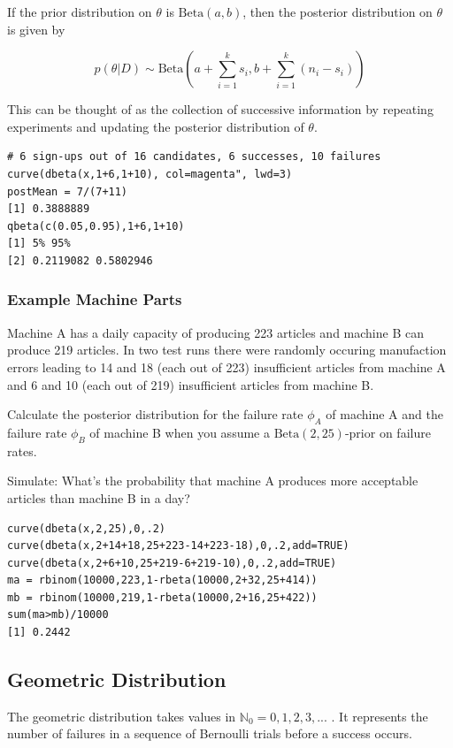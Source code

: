 \documentclass[11pt]{article}
\begin{document}
If the prior distribution on $\theta$ is $\text{Beta}(a,b)$, then the posterior distribution on $\theta$ is given by

\begin{equation*}
	p(\theta|D) \sim \text{Beta}\left(a+\sum_{i=1}^{k}s_i, b + \sum_{i=1}^{k} (n_i - s_i)\right)
\end{equation*}

This can be thought of as the collection of successive information by repeating experiments and updating the posterior distribution of $\theta$.

\begin{verbatim}
# 6 sign-ups out of 16 candidates, 6 successes, 10 failures
curve(dbeta(x,1+6,1+10), col=magenta", lwd=3)
postMean = 7/(7+11)
[1] 0.3888889
qbeta(c(0.05,0.95),1+6,1+10)
[1] 5% 95%
[2] 0.2119082 0.5802946
\end{verbatim}

\subsubsection{Example Machine Parts}
Machine A has a daily capacity of producing 223 articles and machine B can produce 219 articles. In two test runs there were randomly occuring manufaction errors leading to 14 and 18 (each out of 223) insufficient articles from machine A and 6 and 10 (each out of 219) insufficient articles from machine B.

Calculate the posterior distribution for the failure rate $\phi_A$ of machine A and the failure rate $\phi_B$ of machine B when you assume a $\text{Beta}(2,25)$-prior on failure rates.

Simulate: What’s the probability that machine A produces more acceptable articles than machine B in a day?

\begin{verbatim}
curve(dbeta(x,2,25),0,.2)
curve(dbeta(x,2+14+18,25+223-14+223-18),0,.2,add=TRUE)
curve(dbeta(x,2+6+10,25+219-6+219-10),0,.2,add=TRUE)
ma = rbinom(10000,223,1-rbeta(10000,2+32,25+414))
mb = rbinom(10000,219,1-rbeta(10000,2+16,25+422))
sum(ma>mb)/10000
[1] 0.2442
\end{verbatim}

\subsection{Geometric Distribution}
The geometric distribution takes values in $\mathbb{N}_0 = 0,1,2,3,...$ . It represents the number of failures in a sequence of Bernoulli trials before a success occurs.
\end{document}
